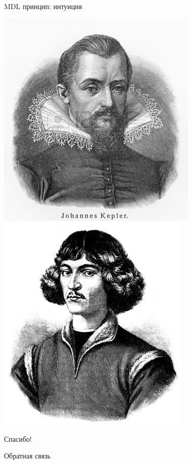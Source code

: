 \documentclass[10pt,a4paper]{beamer}
\begin{document}
\begin{frame}{MDL принцип: интуиция}

\begin{center}
\includegraphics[scale=0.35]{images/kepler.jpg}
\vspace{0.1em}\includegraphics[scale=0.37]{images/copernicus.jpg}
\end{center}

\end{frame}


\begin{frame}{Спасибо!}

\begin{center}
{\Large Обратная связь}
\end{center}

\end{frame}
\end{document}

